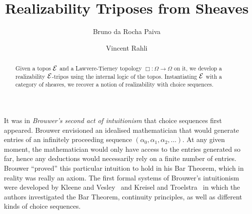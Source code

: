 \documentclass{easychair}
\title{Realizability Triposes from Sheaves}
\author{
 Bruno da Rocha Paiva%
\and
 Vincent Rahli%
}
\institute{
  University of Birmingham, United Kingdom
 }
\begin{document}
\maketitle

\begin{abstract}
  Given a topos \(\mathcal{E}\) and a Lawvere-Tierney topology
  \(\Box : \Omega \to \Omega\) on it, we develop a realizability \(\mathcal{E}\)-tripos
  using the internal logic of the topos.
  Instantiating \(\mathcal{E}\) with a category of sheaves, we recover a notion of
  realizability with choice sequences.
\end{abstract}



%
%



It was in \textit{Brouwer's second act of intuitionism} that choice sequences
first appeared.
%
Brouwer envisioned an idealised mathematician that would
generate entries of an infinitely proceeding sequence
\((\alpha_{0}, \alpha_{1}, \alpha_{2}, \dots)\).
%
At any given moment, the mathematician would only have access to the entries
generated so far, hence any deductions would necessarily rely on a finite number
of entries.
%
Brouwer ``proved'' this particular intuition to hold in his Bar Theorem, which
in reality was really an axiom.
%
The first formal systems of Brouwer's intuitionism were developed by
Kleene and Vesley~\cite{kleeneFoundationsIntuitionisticMathematics1965}
and Kreisel and Troelstra~\cite{kreiselFormalSystemsBranches1970} in which
the authors investigated the Bar Theorem, continuity principles, as well
as different kinds of choice sequences.
\end{document}
